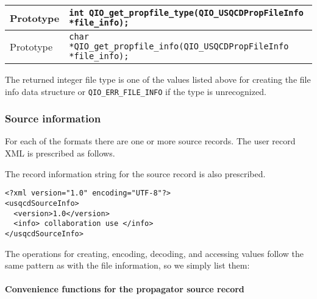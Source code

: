 \documentclass{article}
\begin{document}
\begin{flushleft}
  \begin{tabular}{|l|l|}
  \hline
  Prototype      & \verb|int QIO_get_propfile_type(QIO_USQCDPropFileInfo *file_info);|\\
    \hline
  Prototype      & \verb|char *QIO_get_propfile_info(QIO_USQCDPropFileInfo *file_info);|\\
  \hline
 \end{tabular}
\end{flushleft}
%

The returned integer file type is one of the values listed above for
creating the file info data structure or \verb|QIO_ERR_FILE_INFO| if
the type is unrecognized.

\subsubsection{Source information}

For each of the formats there are one or more source records.  The user
record XML is prescribed as follows.

The record information string for the source record is also
prescribed.

\begin{verbatim}
<?xml version="1.0" encoding="UTF-8"?>
<usqcdSourceInfo>
  <version>1.0</version>
  <info> collaboration use </info>
</usqcdSourceInfo>
\end{verbatim}

The operations for creating, encoding, decoding, and accessing values
follow the same pattern as with the file information, so we simply
list them:

\paragraph{Convenience functions for the propagator source record}
\end{document}
